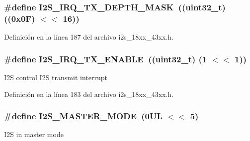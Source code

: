 \subsubsection[{\texorpdfstring{I2\+S\+\_\+\+I\+R\+Q\+\_\+\+T\+X\+\_\+\+D\+E\+P\+T\+H\+\_\+\+M\+A\+SK}{I2S_IRQ_TX_DEPTH_MASK}}]{\setlength{\rightskip}{0pt plus 5cm}\#define I2\+S\+\_\+\+I\+R\+Q\+\_\+\+T\+X\+\_\+\+D\+E\+P\+T\+H\+\_\+\+M\+A\+SK~((uint32\+\_\+t) ((0x0\+F) $<$$<$ 16))}\hypertarget{group___i2_s__18_x_x__43_x_x_gacbd0d516073943ba5aa03e03649e6cc0}{}\label{group___i2_s__18_x_x__43_x_x_gacbd0d516073943ba5aa03e03649e6cc0}


Definición en la línea 187 del archivo i2s\+\_\+18xx\+\_\+43xx.\+h.

\subsubsection[{\texorpdfstring{I2\+S\+\_\+\+I\+R\+Q\+\_\+\+T\+X\+\_\+\+E\+N\+A\+B\+LE}{I2S_IRQ_TX_ENABLE}}]{\setlength{\rightskip}{0pt plus 5cm}\#define I2\+S\+\_\+\+I\+R\+Q\+\_\+\+T\+X\+\_\+\+E\+N\+A\+B\+LE~((uint32\+\_\+t) (1 $<$$<$ 1))}\hypertarget{group___i2_s__18_x_x__43_x_x_ga7811db5a292d68de3dce209883bab6c0}{}\label{group___i2_s__18_x_x__43_x_x_ga7811db5a292d68de3dce209883bab6c0}
I2S control I2S transmit interrupt 

Definición en la línea 183 del archivo i2s\+\_\+18xx\+\_\+43xx.\+h.

\subsubsection[{\texorpdfstring{I2\+S\+\_\+\+M\+A\+S\+T\+E\+R\+\_\+\+M\+O\+DE}{I2S_MASTER_MODE}}]{\setlength{\rightskip}{0pt plus 5cm}\#define I2\+S\+\_\+\+M\+A\+S\+T\+E\+R\+\_\+\+M\+O\+DE~(0\+U\+L $<$$<$ 5)}\hypertarget{group___i2_s__18_x_x__43_x_x_ga67cd00ecbec35d0dd723909916fb1014}{}\label{group___i2_s__18_x_x__43_x_x_ga67cd00ecbec35d0dd723909916fb1014}
I2S in master mode 

